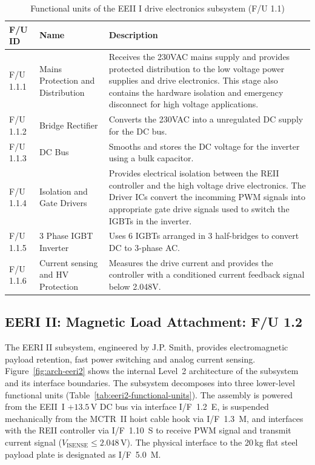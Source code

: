 \begin{table}[H]
    \centering
    \caption{Functional units of the EEII I drive electronics subsystem (F/U 1.1)}
    \label{tab:functional-units-eeri1}
    \begin{tabular}{@{} l l p{7cm} @{}}
        \toprule
        \textbf{F/U ID} & \textbf{Name} & \textbf{Description} \\
        \midrule
        F/U 1.1.1 & Mains Protection and Distribution
        & Receives the 230VAC mains supply and provides protected distribution to the low voltage 
        power supplies and drive electronics. This stage also contains the hardware isolation and emergency
        disconnect for high voltage applications. \\
        F/U 1.1.2 & Bridge Rectifier
         & Converts the 230VAC into a unregulated DC supply for the DC bus. \\
        F/U 1.1.3 & DC Bus
         & Smooths and stores the DC voltage for the inverter using a bulk capacitor. \\
        F/U 1.1.4 & Isolation and Gate Drivers
         & Provides electrical isolation between the REII controller and the high voltage drive electronics.
         The Driver ICs convert the incomming PWM signals into appropriate gate drive signals used to switch 
         the IGBTs in the inverter. \\
        F/U 1.1.5 & 3 Phase IGBT Inverter
         & Uses 6 IGBTs arranged in 3 half-bridges to convert DC to 3-phase AC. \\
        F/U 1.1.6 & Current sensing and HV Protection
         & Measures the drive current and provides the controller with a conditioned current feedback signal
         below 2.048V. \\
        \bottomrule
    \end{tabular}
\end{table}

\subsection{EERI II: Magnetic Load Attachment: F/U 1.2}
\label{subsec:eeri2-fu1p2}
The EERI II subsystem, engineered by J.P. Smith,
provides electromagnetic payload retention,
fast power switching and analog current sensing.
Figure~\ref{fig:arch-eeri2} shows the internal Level~2 architecture of the subsystem and its interface boundaries.
The subsystem decomposes into three lower-level functional units (Table~\ref{tab:eeri2-functional-units}).
The assembly is powered from the EEII~I $+13.5\,\text{V}$ DC bus via interface I/F~1.2~E, is suspended mechanically from the MCTR~II hoist cable hook via I/F~1.3~M,
and interfaces with the REII controller via I/F~1.10~S to receive PWM signal and transmit current signal ($V_{\mathrm{ISENSE}} \le 2.048\,\text{V}$).
The physical interface to the 20\,kg flat steel payload plate is designated as I/F~5.0~M.

